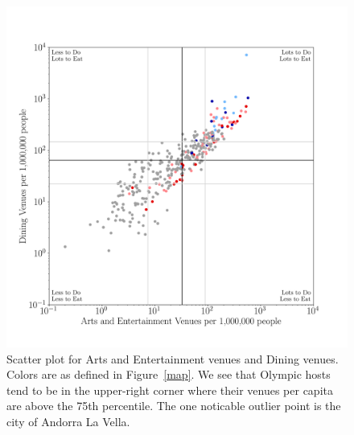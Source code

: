 \documentclass[
 reprint,
 amsmath,amssymb,
 aps,
prb,
floatfix
]{revtex4-2}
\begin{document}
    \begin{figure}[htb]
        \centering
        \includegraphics[width=\columnwidth]{../figures/foodandentertainment_percapita.png}
        \caption{Scatter plot for Arts and Entertainment venues and Dining venues. Colors are as defined in Figure~\ref{map}. We see that Olympic hosts tend to be in the upper-right corner where their venues per capita are above the 75th percentile. The one noticable outlier point is the city of Andorra La Vella.}
        \label{avd_scatter}
    \end{figure}
\end{document}

